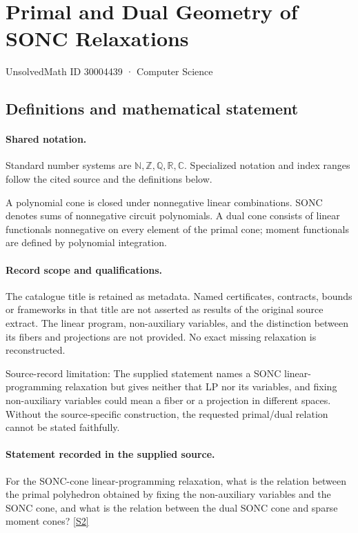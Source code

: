 \documentclass[11pt]{article}
\newcommand{\sref}[2]{\hyperlink{source:#1:#2}{[S#2]}}
\begin{document}
\setcounter{section}{30004438}
\section{Primal and Dual Geometry of SONC Relaxations}\label{30004439}
{\small\sffamily UnsolvedMath ID 30004439 · Computer Science}
\subsection{Definitions and mathematical statement}

\paragraph{Shared notation.}Standard number systems are $\mathbb N,\mathbb Z,\mathbb Q,\mathbb R,\mathbb C$. Specialized notation and index ranges follow the cited source and the definitions below.


A polynomial cone is closed under nonnegative linear combinations. SONC denotes sums of nonnegative circuit polynomials. A dual cone consists of linear functionals nonnegative on every element of the primal cone; moment functionals are defined by polynomial integration.
\paragraph{Record scope and qualifications.}
The catalogue title is retained as metadata. Named certificates, contracts, bounds or frameworks in that title are not asserted as results of the original source extract.
The linear program, non-auxiliary variables, and the distinction between its fibers and projections are not provided. No exact missing relaxation is reconstructed.

Source-record limitation: The supplied statement names a SONC linear-programming relaxation but gives neither that LP nor its variables, and fixing non-auxiliary variables could mean a fiber or a projection in different spaces. Without the source-specific construction, the requested primal/dual relation cannot be stated faithfully.
\paragraph{Statement recorded in the supplied source.}
For the SONC-cone linear-programming relaxation, what is the relation between the primal polyhedron obtained by fixing the non-auxiliary variables and the SONC cone, and what is the relation between the dual SONC cone and sparse moment cones? \sref{30004439}{2}
\end{document}
